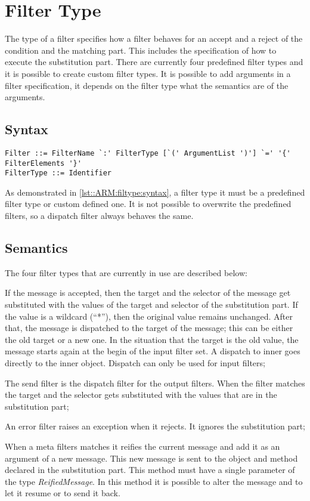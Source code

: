 \chapter{Filter Type} \label{chapter:filtertype}
The type of a filter specifies how a filter behaves for an accept and a reject of the condition and the matching part.
This includes the specification of how to execute the substitution part.
There are currently four predefined filter types and it is possible to create custom filter types.
It is possible to add arguments in a filter specification, it depends on the filter type what the semantics
are of the arguments.

\section*{Syntax}
\begin{lstlisting}[caption = {Filter type syntax}, label = lst::ARM:filtype:syntax,
style = listing, language = ebnf, float = tpb]
Filter ::= FilterName `:' FilterType [`(' ArgumentList ')'] `=' '{' FilterElements '}'
FilterType ::= Identifier
\end{lstlisting}
As demonstrated in \autoref{lst::ARM:filtype:syntax}, a filter type it must be a predefined filter type or custom defined one. It is not possible
to overwrite the predefined filters, so a dispatch filter always behaves the same.

\section*{Semantics}
The four filter types that are currently in use are described below:
\begin{description}[style=nextline,noitemsep]
\item [Dispatch] If the message is accepted, then the target and the selector of the message get substituted with
the values of the target and selector of the substitution part. If the value is a wildcard (``*''), then the
original value remains unchanged. After that, the message is dispatched to the target of the message; this can be
either the old target or a new one. In the situation that the target is the old value, the message starts again at the begin of the
input filter set. A dispatch to inner goes directly to the inner object. Dispatch can only be used for input filters;
\item [Send] The send filter is the dispatch filter for the output filters. When the filter matches the target and the
selector gets substituted with the values that are in the substitution part;
\item [Error] An error filter raises an exception when it rejects. It ignores the substitution part;
\item [Meta] When a meta filters matches it reifies the current message and add it as an argument of a new message.
This new message is sent to the object and method declared in the
substitution part. This method must have a single parameter of the type \emph{ReifiedMessage}. In this method it is
possible to alter the message and to let it resume or to send it back.
\end{description}

